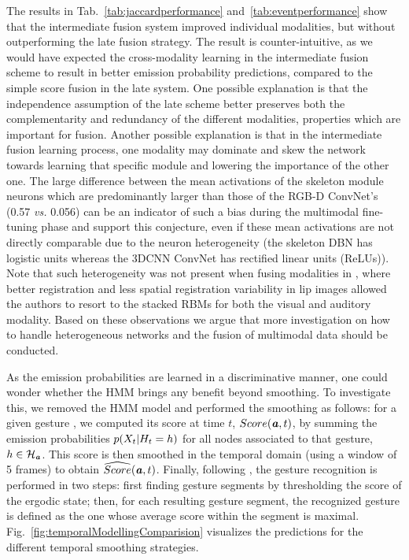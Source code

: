\label{LateIntermediateFusion}
%
The results in Tab.~\ref{tab:jaccardperformance} and~\ref{tab:eventperformance} show that the intermediate fusion system
improved individual modalities, but without outperforming the late fusion strategy.
%
The result is counter-intuitive, as we would have expected the cross-modality learning in the intermediate fusion scheme
to result in better emission probability predictions, compared to the simple score fusion in the late system.
%
One possible explanation is that the independence assumption of the late scheme better preserves both
the complementarity and redundancy of the different modalities, properties which are important for fusion.
%
Another possible explanation is that in the intermediate fusion learning process,
one modality may dominate and  skew the network towards  learning that specific module and
lowering the importance of the other one.
%
The large difference between the mean activations of the  skeleton module neurons which are predominantly larger than those of the
RGB-D ConvNet's (0.57 \emph{vs.} 0.056) can be an indicator of such a bias during the multimodal fine-tuning phase and
support this conjecture, even if these mean activations are not directly comparable
due to the neuron heterogeneity (the skeleton DBN has logistic units whereas the 3DCNN ConvNet has rectified linear units (ReLUs)).
%
Note that such heterogeneity was not present when fusing modalities  in \cite{Ngiam2011multimodal},
where better registration and less spatial registration variability in lip images
allowed the authors to resort to the stacked RBMs for both the visual and auditory modality.
%
Based on these observations we argue that more investigation on how to handle heterogeneous networks and the fusion of multimodal data should be conducted.



%

%
As the emission probabilities are learned in a discriminative manner, one could  wonder whether the HMM brings any benefit beyond smoothing.
To investigate this, we removed the HMM model and performed the smoothing as follows:
for a given gesture \gesturea, we computed its score at time $t$, $Score(\textbf{\emph{a}},t)$, by summing the emission
probabilities $p(X_t|H_t = h)$ for all nodes associated to that gesture,
\ie $h \in \mathcal{H}_{\textbf{\emph{a}}}$.
%
This score is then smoothed in the temporal domain (using a window of 5 frames) to obtain $\widehat{Score}(\textbf{\emph{a}},t)$.
%
Finally, following \cite{neverova2014moddrop}, the gesture recognition is performed in two steps:
first finding gesture segments by thresholding the score of the ergodic state;
then, for each resulting gesture segment, the recognized gesture is defined as the one whose average score within the segment is maximal.
%
Fig.~\ref{fig:temporalModellingComparision} visualizes the predictions for the different temporal smoothing strategies.


